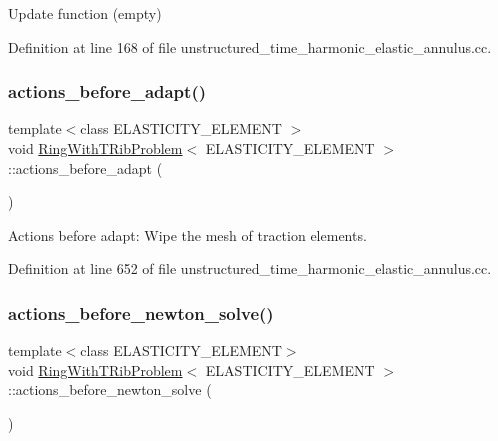 Update function (empty) 



Definition at line 168 of file unstructured\+\_\+time\+\_\+harmonic\+\_\+elastic\+\_\+annulus.\+cc.

\mbox{\label{classRingWithTRibProblem_a7a170199d58390ae43a044294bfc7ac5}} 
\subsubsection{\texorpdfstring{actions\+\_\+before\+\_\+adapt()}{actions\_before\_adapt()}}
{\footnotesize\ttfamily template$<$class E\+L\+A\+S\+T\+I\+C\+I\+T\+Y\+\_\+\+E\+L\+E\+M\+E\+NT $>$ \\
void \hyperlink{classRingWithTRibProblem}{Ring\+With\+T\+Rib\+Problem}$<$ E\+L\+A\+S\+T\+I\+C\+I\+T\+Y\+\_\+\+E\+L\+E\+M\+E\+NT $>$\+::actions\+\_\+before\+\_\+adapt (\begin{DoxyParamCaption}{ }\end{DoxyParamCaption})}



Actions before adapt\+: Wipe the mesh of traction elements. 



Definition at line 652 of file unstructured\+\_\+time\+\_\+harmonic\+\_\+elastic\+\_\+annulus.\+cc.

\mbox{\label{classRingWithTRibProblem_aa74a20d5bd6d7f16eb00080734dde0d1}} 
\subsubsection{\texorpdfstring{actions\+\_\+before\+\_\+newton\+\_\+solve()}{actions\_before\_newton\_solve()}}
{\footnotesize\ttfamily template$<$class E\+L\+A\+S\+T\+I\+C\+I\+T\+Y\+\_\+\+E\+L\+E\+M\+E\+NT$>$ \\
void \hyperlink{classRingWithTRibProblem}{Ring\+With\+T\+Rib\+Problem}$<$ E\+L\+A\+S\+T\+I\+C\+I\+T\+Y\+\_\+\+E\+L\+E\+M\+E\+NT $>$\+::actions\+\_\+before\+\_\+newton\+\_\+solve (\begin{DoxyParamCaption}{ }\end{DoxyParamCaption})\hspace{0.3cm}{\ttfamily [inline]}}



